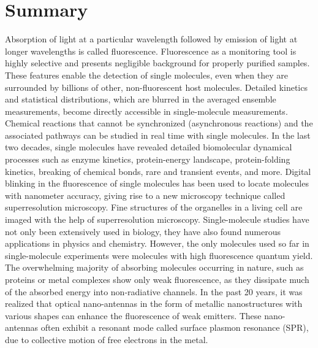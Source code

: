 \chapter*{Summary}
\label{ch:Summary}

Absorption of light at a particular wavelength followed by emission of light at longer wavelengths is called fluorescence.
Fluorescence as a monitoring tool is highly selective and presents negligible background for properly purified samples. These features enable the detection of single molecules, even when they are surrounded by billions of other, non-fluorescent host molecules.
Detailed kinetics and statistical distributions, which are blurred in the averaged ensemble measurements, become directly accessible in single-molecule measurements.
Chemical reactions that cannot be synchronized (asynchronous reactions) and the associated pathways can be studied in real time with single molecules.
In the last two decades, single molecules have revealed detailed biomolecular dynamical processes such as enzyme kinetics, protein-energy landscape, protein-folding kinetics, breaking of chemical bonds, rare and transient events, and more.
Digital blinking in the fluorescence of single molecules has been used to locate molecules with nanometer accuracy, giving rise to a new microscopy technique called superresolution microscopy.
Fine structures of the organelles in a living cell are imaged with the help of superresolution microscopy.
Single-molecule studies have not only been extensively used in biology, they have also found numerous applications in physics and chemistry.
However, the only molecules used so far in single-molecule experiments were molecules with high fluorescence quantum yield.
The overwhelming majority of absorbing molecules occurring in nature, such as proteins or metal complexes show only weak fluorescence, as they dissipate much of the absorbed energy into non-radiative channels.
In the past 20 years, it was realized that optical nano-antennas in the form of metallic nanostructures with various shapes can enhance the fluorescence of weak emitters.
These nano-antennas often exhibit a resonant mode called surface plasmon resonance (SPR), due to collective motion of free electrons in the metal.
